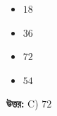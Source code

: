 \documentclass[12pt, a4paper]{article}
\begin{document}
\begin{itemize}[label={}, leftmargin=1cm, itemsep=0.5em]
    \item[\textbf{A)}] $18$
    \item[\textbf{B)}] $36$
    \item[\textbf{C)}] $72$
    \item[\textbf{D)}] $54$
\end{itemize}

\vspace{0.5em}
\begin{tcolorbox}[answerbox]
    \textbf{\color{success} উত্তর:} C) $72$
\end{tcolorbox}
\vspace{1em}
\end{document}
